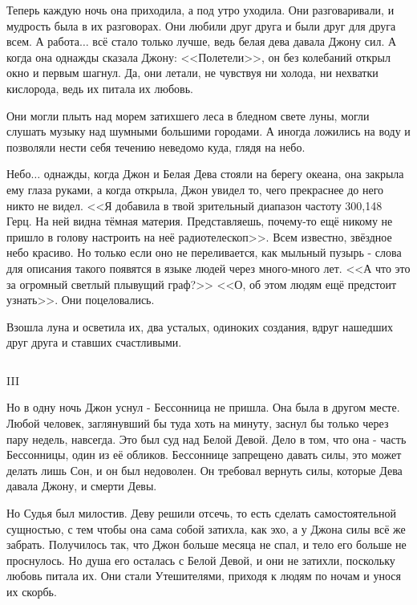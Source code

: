 \documentclass{article}
\begin{document}
Теперь каждую ночь она приходила, а под утро уходила. Они разговаривали, и мудрость была в их разговорах. Они любили друг друга и были друг для друга всем. А работа$ \ldots $ всё стало только лучше, ведь белая дева давала Джону сил. А когда она однажды сказала Джону: <<Полетели>>, он без колебаний открыл окно и первым шагнул. Да, они летали, не чувствуя ни холода, ни нехватки кислорода, ведь их питала их любовь. 

Они могли плыть над морем затихшего леса в бледном свете луны, могли слушать музыку над шумными большими городами. А иногда ложились на воду и позволяли нести себя течению неведомо куда, глядя на небо. 

Небо$ \ldots $ однажды, когда Джон и Белая Дева стояли на берегу океана, она закрыла ему глаза руками, а когда открыла, Джон увидел то, чего прекраснее до него никто не видел. <<Я добавила в твой зрительный диапазон частоту 300,148 Герц. На ней видна тёмная материя. Представляешь, почему-то ещё никому не пришло в голову настроить на неё радиотелескоп>>. Всем известно, звёздное небо красиво. Но только если оно не переливается, как мыльный пузырь - слова для описания такого появятся в языке людей через много-много лет. <<А что это за огромный светлый плывущий граф?>> <<О, об этом людям ещё предстоит узнать>>. Они поцеловались. 

Взошла луна и осветила их, два усталых, одиноких создания, вдруг нашедших друг друга и ставших счастливыми.

$ $

\begin{center}
III
\end{center}

Но в одну ночь Джон уснул - Бессонница не пришла. Она была в другом месте. Любой человек, заглянувший бы туда хоть на минуту, заснул бы только через пару недель, навсегда. Это был суд над Белой Девой. Дело в том, что она - часть Бессонницы, один из её обликов. Бессоннице запрещено давать силы, это может делать лишь Сон, и он был недоволен. Он требовал вернуть силы, которые Дева давала Джону, и смерти Девы. 

Но Судья был милостив. Деву решили отсечь, то есть сделать самостоятельной сущностью, с тем чтобы она сама собой затихла, как эхо, а у Джона силы всё же забрать. Получилось так, что Джон больше месяца не спал, и тело его больше не проснулось. Но душа его осталась с Белой Девой, и они не затихли, поскольку любовь питала их. Они стали Утешителями, приходя к людям по ночам и унося их скорбь.
\end{document}
